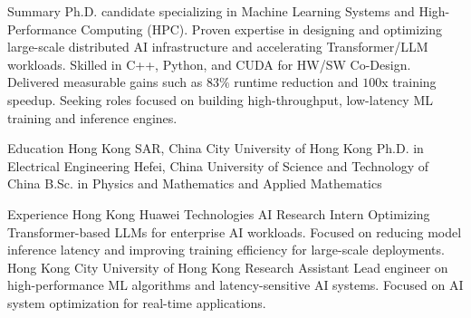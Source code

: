 \documentclass[caps, english]{financecv}
\begin{document}
\begin{cvsection}{Summary}
    Ph.D. candidate specializing in Machine Learning Systems and High-Performance Computing (HPC). Proven expertise in designing and optimizing large-scale distributed AI infrastructure and accelerating Transformer/LLM workloads. Skilled in C++, Python, and CUDA for HW/SW Co-Design. Delivered measurable gains such as $83\%$ runtime reduction and $100$x training speedup. Seeking roles focused on building high-throughput, low-latency ML training and inference engines.
\end{cvsection}

\begin{cvsection}{Education}
    {Hong Kong SAR, China}
    {City University of Hong Kong}
    {}
    {Ph.D. in Electrical Engineering}
    {}
    {}
    {}
    {Hefei, China}
    {University of Science and Technology of China}
    {}
    {B.Sc. in Physics and Mathematics and Applied Mathematics}
    {}
    {}
    {}
\end{cvsection}

\begin{cvsection}{Experience}
    {Hong Kong}
    {Huawei Technologies}
    {AI Research Intern}
    {Optimizing Transformer-based LLMs for enterprise AI workloads. Focused on reducing model inference latency and improving training efficiency for large-scale deployments.}
    {}
    {}
    {}
    {Hong Kong}
    {City University of Hong Kong}
    {Research Assistant}
    {Lead engineer on high-performance ML algorithms and latency-sensitive AI systems. Focused on AI system optimization for real-time applications.}
    {}
    {}
    {}
\end{cvsection}
\end{document}
